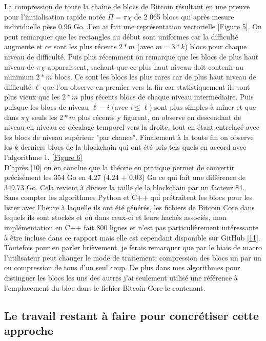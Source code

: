 \documentclass[12pt,a4paper]{article}
\newcommand{\source}[1]{\hyperlink{#1}{[#1]}}
\newcommand{\annexe}[2]{\hyperlink{#1}{[Figure #2]}}
\begin{document}
	La compression de toute la chaîne de blocs de Bitcoin résultant en une preuve pour l'initialisation rapide notée $\Pi = \pi\chi$ de 2 065 blocs qui après mesure individuelle pèse 0.96 Go. J'en ai fait une représentation vectorielle \annexe{25}{5}. On peut remarquer que les rectangles au début sont uniformes car la difficulté augmente et ce sont les plus récents $2*m$ (avec $m = 3*k$) blocs pour chaque niveau de difficulté. Puis plus récemment on remarque que les blocs de plus haut niveau de $\pi\chi$ apparaissent, sachant que ce plus haut niveau doit contenir au minimum $2*m$ blocs. Ce sont les blocs les plus rares car de plus haut niveau de difficulté $\ell$ que l'on observe en premier vers la fin car statistiquement ils sont plus vieux que les $2*m$ plus récents blocs de chaque niveau intermédiaire. Puis puisque les blocs de niveau $\ell - i$ (avec $i \leq \ell$) sont plus simples à miner et que dans $\pi\chi$ seuls les $2*m$ plus récents y figurent, on observe en descendant de niveau en niveau ce décalage temporel vers la droite, tout en étant entrelacé avec les blocs de niveau supérieur "par chance". Finalement à la toute fin on observe les $k$ derniers blocs de la blockchain qui ont été pris tels quels en accord avec l'algorithme 1. \annexe{26}{6}\\ %
D'après \source{10} on en conclue que la théorie en pratique permet de convertir précisément les 354 Go en 4.27 (4.24 + 0.03) Go ce qui fait une différence de 349.73 Go. Cela revient à diviser la taille de la blockchain par un facteur 84.\\
	
	Sans compter les algorithmes Python et C++ qui prétraitent les blocs pour les lister avec l'heure à laquelle ils ont été générés, les fichiers de Bitcoin Core dans lequels ils sont stockés et où dans ceux-ci et leurs hachés associés, mon implémentation en C++ fait 800 lignes et n'est pas particulièrement intéressante à être incluse dans ce rapport mais elle est cependant disponible sur GitHub \source{11}. Toutefois pour en parler brièvement, je ferais remarquer que par le biais de macro l'utilisateur peut changer le mode de traitement: compression des blocs un par un ou compression de tous d'un seul coup. De plus dans mes algorithmes pour distinguer les blocs les uns des autres j'ai seulement utilisé une référence à l'emplacement du bloc dans le fichier Bitcoin Core le contenant. %
	
	\subsection{Le travail restant à faire pour concrétiser cette approche}
	
\end{document}
